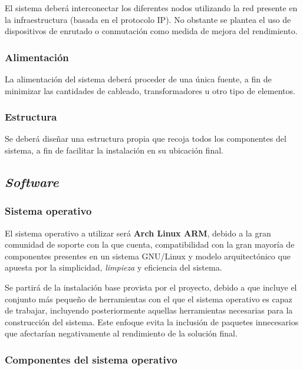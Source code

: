 El sistema deberá interconectar los diferentes nodos utilizando la red presente en la infraestructura (basada en el protocolo IP). No obstante se plantea el uso de dispositivos de enrutado o conmutación como medida de mejora del rendimiento.

\subsubsection{Alimentación}

La alimentación del sistema deberá proceder de una única fuente, a fin de minimizar las cantidades de  cableado, transformadores u otro tipo de elementos.

\subsubsection{Estructura}

Se deberá diseñar una estructura propia que recoja todos los componentes del sistema, a fin de facilitar la instalación en su ubicación final.

\subsection{\textit{Software}}

\subsubsection{Sistema operativo}
\label{problema:sistemaoperativo}

El sistema operativo a utilizar será \textbf{Arch Linux ARM}, debido a la gran comunidad de soporte con la que cuenta, compatibilidad con la gran mayoría de componentes presentes en un sistema GNU/Linux y modelo arquitectónico que apuesta por la simplicidad, \textit{limpieza} y eficiencia del sistema.

Se partirá de la instalación base provista por el proyecto, debido a que incluye el conjunto más pequeño de herramientas con el que el sistema operativo es capaz de trabajar, incluyendo posteriormente aquellas herramientas necesarias para la construcción del sistema. Este enfoque evita la inclusión de paquetes innecesarios que afectarían negativamente al rendimiento de la solución final.

\subsubsection{Componentes del sistema operativo}

